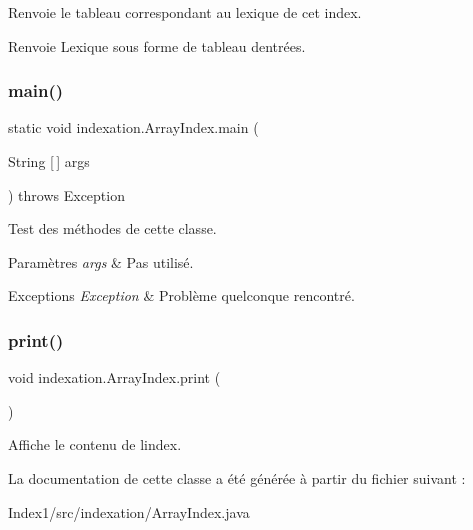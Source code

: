 Renvoie le tableau correspondant au lexique de cet index.

\begin{DoxyReturn}{Renvoie}
Lexique sous forme de tableau d\textquotesingle{}entrées. 
\end{DoxyReturn}
\mbox{\label{classindexation_1_1ArrayIndex_ae1fcca43891bb344ae97dbf32c065808}} 
\subsubsection{\texorpdfstring{main()}{main()}}
{\footnotesize\ttfamily static void indexation.\+Array\+Index.\+main (\begin{DoxyParamCaption}\item[{String \mbox{[}$\,$\mbox{]}}]{args }\end{DoxyParamCaption}) throws Exception\hspace{0.3cm}{\ttfamily [static]}}

Test des méthodes de cette classe.


\begin{DoxyParams}{Paramètres}
{\em args} & Pas utilisé.\\
\hline
\end{DoxyParams}

\begin{DoxyExceptions}{Exceptions}
{\em Exception} & Problème quelconque rencontré. \\
\hline
\end{DoxyExceptions}
\mbox{\label{classindexation_1_1ArrayIndex_aa5639c426c9b0c833be7826ed01f1222}} 
\subsubsection{\texorpdfstring{print()}{print()}}
{\footnotesize\ttfamily void indexation.\+Array\+Index.\+print (\begin{DoxyParamCaption}{ }\end{DoxyParamCaption})}

Affiche le contenu de l\textquotesingle{}index. 

La documentation de cette classe a été générée à partir du fichier suivant \+:\begin{DoxyCompactItemize}
\item 
Index1/src/indexation/Array\+Index.\+java\end{DoxyCompactItemize}
